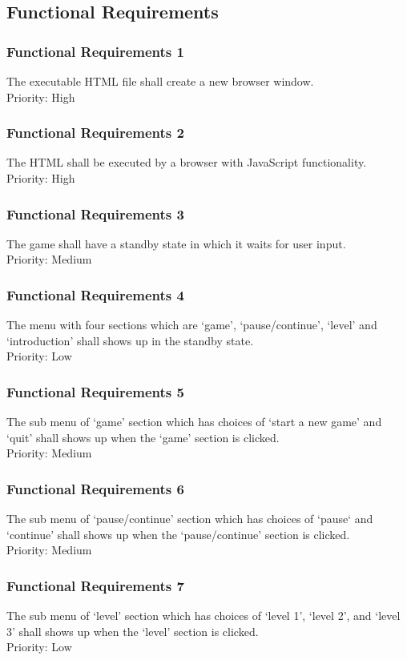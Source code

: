 \documentclass[12pt, titlepage]{article}
\begin{document}
\subsection{Functional Requirements}
\subsubsection{Functional Requirements 1} The executable HTML file shall create a new browser window.\\Priority: High
\subsubsection{Functional Requirements 2} The HTML shall be executed by a browser with JavaScript functionality.\\Priority: High
\subsubsection{Functional Requirements 3} The game shall have a standby state in which it waits for user input.\\Priority: Medium
\subsubsection{Functional Requirements 4} The menu with four sections which are `game', `pause/continue', `level' and
 `introduction' shall shows up in the standby state.\\Priority: Low
\subsubsection{Functional Requirements 5} The sub menu of `game' section which has choices of `start a new game' and 
`quit' shall shows up when the `game' section is clicked.\\Priority: Medium
\subsubsection{Functional Requirements 6} The sub menu of  `pause/continue' section which has choices of `pause‘ and  
`continue' shall shows up when the `pause/continue' section is clicked.\\Priority: Medium
\subsubsection{Functional Requirements 7} The sub menu of  `level' section which has choices of `level 1', `level 2',
 and `level 3' shall shows up when the `level' section is clicked.\\Priority: Low
\end{document}

